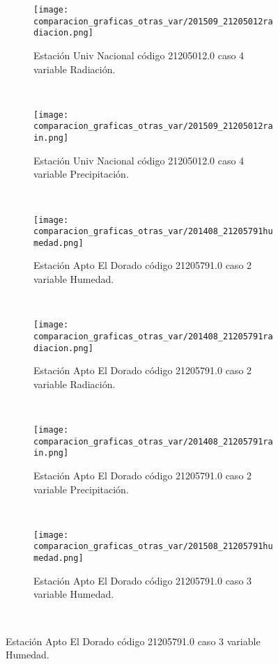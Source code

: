 \begin{figure}[H]
\centering
\begin{subfigure}[normla]{0.4\textwidth}
\caption{Estación Univ Nacional código 21205012.0 caso 4 variable Radiación.}
\texttt{[image: comparacion\_graficas\_otras\_var/201509\_21205012radiacion.png]}
\end{subfigure}
~
\begin{subfigure}[normla]{0.4\textwidth}
\caption{Estación Univ Nacional código 21205012.0 caso 4 variable Precipitación.}
\texttt{[image: comparacion\_graficas\_otras\_var/201509\_21205012rain.png]}
\end{subfigure}
~
\begin{subfigure}[normla]{0.4\textwidth}
\caption{Estación Apto El Dorado código 21205791.0 caso 2 variable Humedad.}
\texttt{[image: comparacion\_graficas\_otras\_var/201408\_21205791humedad.png]}
\end{subfigure}
~
\begin{subfigure}[normla]{0.4\textwidth}
\caption{Estación Apto El Dorado código 21205791.0 caso 2 variable Radiación.}
\texttt{[image: comparacion\_graficas\_otras\_var/201408\_21205791radiacion.png]}
\end{subfigure}
~
\begin{subfigure}[normla]{0.4\textwidth}
\caption{Estación Apto El Dorado código 21205791.0 caso 2 variable Precipitación.}
\texttt{[image: comparacion\_graficas\_otras\_var/201408\_21205791rain.png]}
\end{subfigure}
~
\begin{subfigure}[normla]{0.4\textwidth}
\caption{Estación Apto El Dorado código 21205791.0 caso 3 variable Humedad.}
\texttt{[image: comparacion\_graficas\_otras\_var/201508\_21205791humedad.png]}
\end{subfigure}
~
\end{figure}
           
